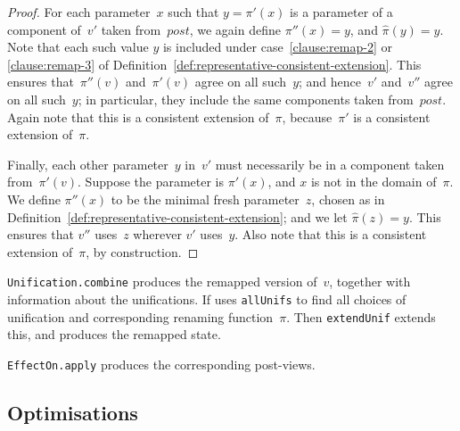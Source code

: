 \begin{proof}
For each parameter~$x$ such that $y = \pi'(x)$ is a parameter of a component
of~$v'$ taken from~$post$, we again define $\pi''(x) = y$, and $\hat\pi(y) =
y$.  Note that each such value $y$ is included under
case~\ref{clause:remap-2} or \ref{clause:remap-3} of
Definition~\ref{def:representative-consistent-extension}.  This ensures
that~$\pi''(v)$ and~$\pi'(v)$ agree on all such~$y$; and hence~$v'$ and~$v''$
agree on all such~$y$; in particular, they include the same components taken
from~$post$.  Again note that this is a consistent extension of~$\pi$,
because~$\pi'$ is a consistent extension of~$\pi$. 

Finally, each other parameter~$y$ in~$v'$ must necessarily be in a component
taken from~$\pi'(v)$.  Suppose the parameter is $\pi'(x)$, and $x$ is not in
the domain of~$\pi$.  We define $\pi''(x)$ to be the minimal fresh
parameter~$z$, chosen as in
Definition~\ref{def:representative-consistent-extension}; and we let
$\hat\pi(z) = y$.  This ensures that $v''$ uses~$z$ wherever $v'$ uses~$y$.
Also note that this is a consistent extension of~$\pi$, by construction.
\end{proof}


\begin{impNote}
\texttt{Unification.combine} produces the remapped version of~$v$, together
with information about the unifications.  If uses \texttt{allUnifs} to find
all choices of unification and corresponding renaming function~$\pi$.  Then
\texttt{extendUnif} extends this, and produces the remapped state.

\texttt{EffectOn.apply} produces the corresponding post-views.
\end{impNote}


\subsection{Optimisations} 



